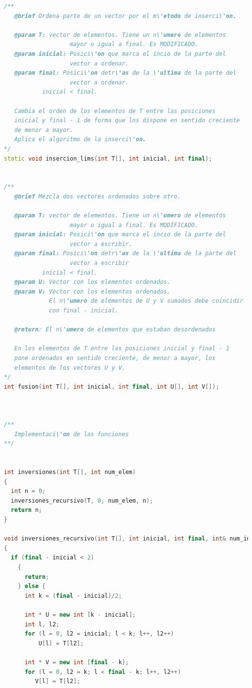 \begin{lstlisting}[language=c++]
/**
   @brief Ordena parte de un vector por el m\'etodo de inserci\'on.

   @param T: vector de elementos. Tiene un n\'umero de elementos
                   mayor o igual a final. Es MODIFICADO.
   @param inicial: Posici\'on que marca el incio de la parte del
                   vector a ordenar.
   @param final: Posici\'on detr\'as de la \'ultima de la parte del
                   vector a ordenar.
		   inicial < final.

   Cambia el orden de los elementos de T entre las posiciones
   inicial y final - 1 de forma que los dispone en sentido creciente
   de menor a mayor.
   Aplica el algoritmo de la inserci\'on.
*/
static void insercion_lims(int T[], int inicial, int final);


/**
   @brief Mezcla dos vectores ordenados sobre otro.

   @param T: vector de elementos. Tiene un n\'umero de elementos
                   mayor o igual a final. Es MODIFICADO.
   @param inicial: Posici\'on que marca el incio de la parte del
                   vector a escribir.
   @param final: Posici\'on detr\'as de la \'ultima de la parte del
                   vector a escribir
		   inicial < final.
   @param U: Vector con los elementos ordenados.
   @param V: Vector con los elementos ordenados.
             El n\'umero de elementos de U y V sumados debe coincidir
             con final - inicial.

   @return: El n\'umero de elementos que estaban desordenados

   En los elementos de T entre las posiciones inicial y final - 1
   pone ordenados en sentido creciente, de menor a mayor, los
   elementos de los vectores U y V.
*/
int fusion(int T[], int inicial, int final, int U[], int V[]);



/**
   Implementaci\'on de las funciones
**/


int inversiones(int T[], int num_elem)
{
  int n = 0;
  inversiones_recursivo(T, 0, num_elem, n);
  return n;
}

void inversiones_recursivo(int T[], int inicial, int final, int& num_inversiones)
{
  if (final - inicial < 2)
    {
      return;
    } else {
      int k = (final - inicial)/2;

      int * U = new int [k - inicial];
      int l, l2;
      for (l = 0, l2 = inicial; l < k; l++, l2++)
	      U[l] = T[l2];

      int * V = new int [final - k];
      for (l = 0, l2 = k; l < final - k; l++, l2++)
	     V[l] = T[l2];


\end{lstlisting}
